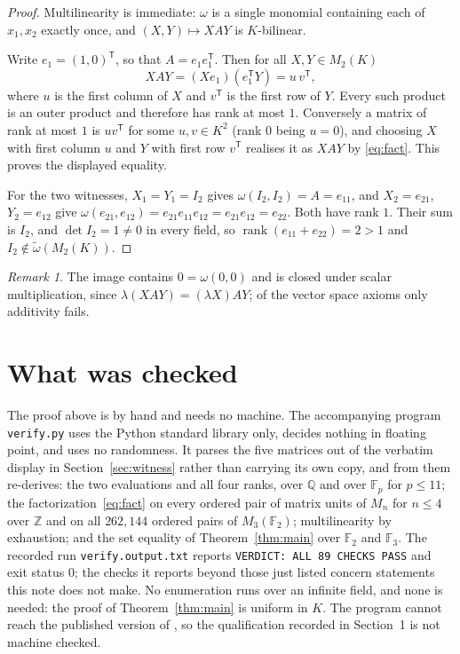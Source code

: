 \documentclass[11pt]{amsart}
\theoremstyle{remark}
\newtheorem*{remark}{Remark}
\DeclareMathOperator{\rank}{rank}
\newcommand{\im}{\widetilde\omega}
\begin{document}
\begin{proof}
Multilinearity is immediate: $\omega$ is a single monomial containing each of
$x_1,x_2$ exactly once, and $(X,Y)\mapsto XAY$ is $K$-bilinear.

Write $e_1=(1,0)^{\mathsf T}$, so that $A=e_1e_1^{\mathsf T}$. Then for all
$X,Y\in M_2(K)$
\begin{equation}\label{eq:fact}
  XAY=(Xe_1)(e_1^{\mathsf T}Y)=u\,v^{\mathsf T},
\end{equation}
where $u$ is the first column of $X$ and $v^{\mathsf T}$ is the first row
of $Y$.
Every such product is an outer product and therefore has rank at most $1$.
Conversely a matrix of rank at most $1$ is $uv^{\mathsf T}$ for some
$u,v\in K^2$ (rank $0$ being $u=0$), and choosing $X$ with first column $u$
and $Y$ with first row $v^{\mathsf T}$ realises it as $XAY$ by
\eqref{eq:fact}. This proves the displayed equality.

For the two witnesses, $X_1=Y_1=I_2$ gives $\omega(I_2,I_2)=A=e_{11}$, and
$X_2=e_{21}$, $Y_2=e_{12}$ give
$\omega(e_{21},e_{12})=e_{21}e_{11}e_{12}=e_{21}e_{12}=e_{22}$. Both have
rank $1$. Their sum is $I_2$, and $\det I_2=1\ne0$ in every field, so
$\rank(e_{11}+e_{22})=2>1$ and $I_2\notin\im(M_2(K))$.
\end{proof}

\begin{remark}
The image contains $0=\omega(0,0)$ and is closed under scalar multiplication,
since $\lambda(XAY)=(\lambda X)AY$; of the vector space axioms only
additivity fails.
\end{remark}

\section{What was checked}

The proof above is by hand and needs no machine. The accompanying program
\texttt{verify.py} uses the Python standard library only, decides nothing in
floating point, and uses no randomness. It parses the five matrices out of the
verbatim display in Section~\ref{sec:witness} rather than carrying its own
copy, and from them re-derives: the two evaluations and all four ranks, over
$\mathbb Q$ and over $\mathbb F_p$ for $p\le11$; the
factorization~\eqref{eq:fact} on every ordered pair of matrix units of $M_n$
for $n\le4$ over $\mathbb Z$ and on all $262{,}144$ ordered pairs of
$M_3(\mathbb F_2)$; multilinearity by exhaustion; and the set equality of
Theorem~\ref{thm:main} over $\mathbb F_2$ and $\mathbb F_3$. The recorded run
\texttt{verify.output.txt} reports \texttt{VERDICT: ALL 89 CHECKS PASS} and
exit status $0$; the checks it reports beyond those just listed concern
statements this note does not make. No enumeration runs over an infinite
field, and none is needed: the proof of Theorem~\ref{thm:main} is uniform in
$K$. The program cannot reach the published version of \cite{PSS}, so the
qualification recorded in Section~1 is not machine checked.
\end{document}
